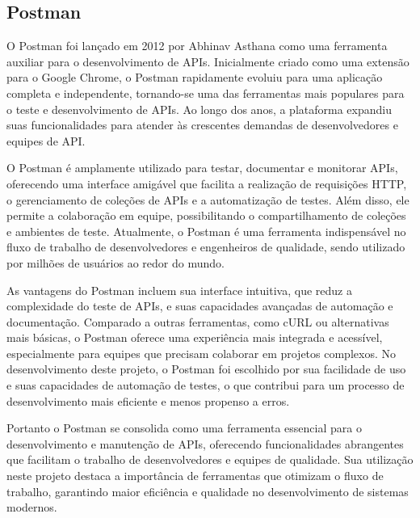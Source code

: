\subsection{Postman}

O Postman foi lançado em 2012 por Abhinav Asthana como uma ferramenta auxiliar para o desenvolvimento de APIs. Inicialmente criado como uma extensão para o Google Chrome, o Postman rapidamente evoluiu para uma aplicação completa e independente, tornando-se uma das ferramentas mais populares para o teste e desenvolvimento de APIs. Ao longo dos anos, a plataforma expandiu suas funcionalidades para atender às crescentes demandas de desenvolvedores e equipes de API.

O Postman é amplamente utilizado para testar, documentar e monitorar APIs, oferecendo uma interface amigável que facilita a realização de requisições HTTP, o gerenciamento de coleções de APIs e a automatização de testes. Além disso, ele permite a colaboração em equipe, possibilitando o compartilhamento de coleções e ambientes de teste. Atualmente, o Postman é uma ferramenta indispensável no fluxo de trabalho de desenvolvedores e engenheiros de qualidade, sendo utilizado por milhões de usuários ao redor do mundo.

As vantagens do Postman incluem sua interface intuitiva, que reduz a complexidade do teste de APIs, e suas capacidades avançadas de automação e documentação. Comparado a outras ferramentas, como cURL ou alternativas mais básicas, o Postman oferece uma experiência mais integrada e acessível, especialmente para equipes que precisam colaborar em projetos complexos. No desenvolvimento deste projeto, o Postman foi escolhido por sua facilidade de uso e suas capacidades de automação de testes, o que contribui para um processo de desenvolvimento mais eficiente e menos propenso a erros.

Portanto o Postman se consolida como uma ferramenta essencial para o desenvolvimento e manutenção de APIs, oferecendo funcionalidades abrangentes que facilitam o trabalho de desenvolvedores e equipes de qualidade. Sua utilização neste projeto destaca a importância de ferramentas que otimizam o fluxo de trabalho, garantindo maior eficiência e qualidade no desenvolvimento de sistemas modernos.
